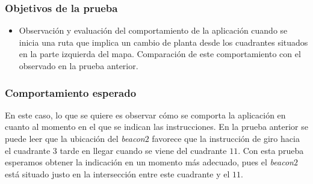 \subsubsection*{Objetivos de la prueba}

\begin{itemize}
	\item Observación y evaluación del comportamiento de la aplicación cuando se inicia una ruta que implica un cambio de planta desde los cuadrantes situados en la parte izquierda del mapa. Comparación de este comportamiento con el observado en la prueba anterior.
\end{itemize}


\subsubsection*{Comportamiento esperado}

En este caso, lo que se quiere es observar cómo se comporta la aplicación en cuanto al momento en el que se indican las instrucciones. En la prueba anterior se puede leer que la ubicación del \textit{beacon$2$} favorece que la instrucción de giro hacia el cuadrante $3$ tarde en llegar cuando se viene del cuadrante $11$. Con esta prueba esperamos obtener la indicación en un momento más adecuado, pues el \textit{beacon$2$} está situado justo en la intersección entre este cuadrante y el $11$.

